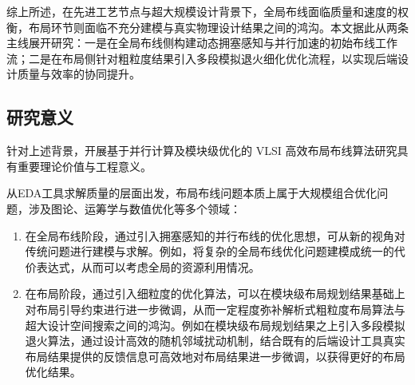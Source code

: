 

综上所述，在先进工艺节点与超大规模设计背景下，全局布线面临质量和速度的权衡，布局环节则面临不充分建模与真实物理设计结果之间的鸿沟。本文据此从两条主线展开研究：一是在全局布线侧构建动态拥塞感知与并行加速的初始布线工作流；二是在布局侧针对粗粒度结果引入多段模拟退火细化优化流程，以实现后端设计质量与效率的协同提升。

\subsection{研究意义}

针对上述背景，开展基于并行计算及模块级优化的 VLSI 高效布局布线算法研究具有重要理论价值与工程意义。

从EDA工具求解质量的层面出发，布局布线问题本质上属于大规模组合优化问题，涉及图论、运筹学与数值优化等多个领域：

\begin{enumerate}
	\item 在全局布线阶段，通过引入拥塞感知的并行布线的优化思想，可从新的视角对传统问题进行建模与求解。例如，将复杂的全局布线优化问题建模成统一的代价表达式，从而可以考虑全局的资源利用情况。
	\item 在布局阶段，通过引入细粒度的优化算法，可以在模块级布局规划结果基础上对布局引导约束进行进一步微调，从而一定程度弥补解析式粗粒度布局算法与超大设计空间搜索之间的鸿沟。例如在模块级布局规划结果之上引入多段模拟退火算法，通过设计高效的随机邻域扰动机制，结合既有的后端设计工具真实布局结果提供的反馈信息可高效地对布局结果进一步微调，以获得更好的布局优化结果。
\end{enumerate}


